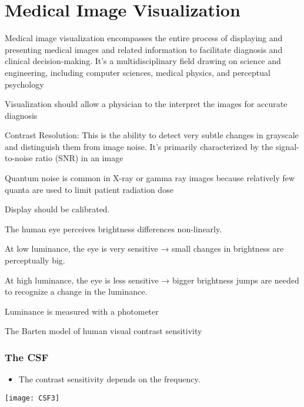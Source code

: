 \part{Medical Image Visualization}

Medical image visualization encompasses the entire process of displaying and presenting medical images and related information to facilitate diagnosis and clinical decision-making. It's a multidisciplinary field drawing on science and engineering, including computer sciences, medical physics, and perceptual psychology

Visualization should allow a physician to the interpret the images for accurate diagnosis

Contrast Resolution: This is the ability to detect very subtle changes in grayscale and distinguish them from image noise. It's primarily characterized by the signal-to-noise ratio (SNR) in an image

Quantum noise is common in X-ray or gamma ray images because relatively few quanta are used to limit patient radiation dose

Display should be calibrated.

The human eye perceives brightness differences non-linearly.

At low luminance, the eye is very sensitive → small changes in brightness are perceptually big.

At high luminance, the eye is less sensitive → bigger brightness jumps are needed to recognize a change in the luminance.

Luminance is measured with a photometer

The Barten model of human visual contrast sensitivity


\section{The \gls{CSF}}
\begin{itemize}
\item The contrast sensitivity depends on the frequency.
\end{itemize}
\begin{center}
\texttt{[image: CSF3]}
\end{center}